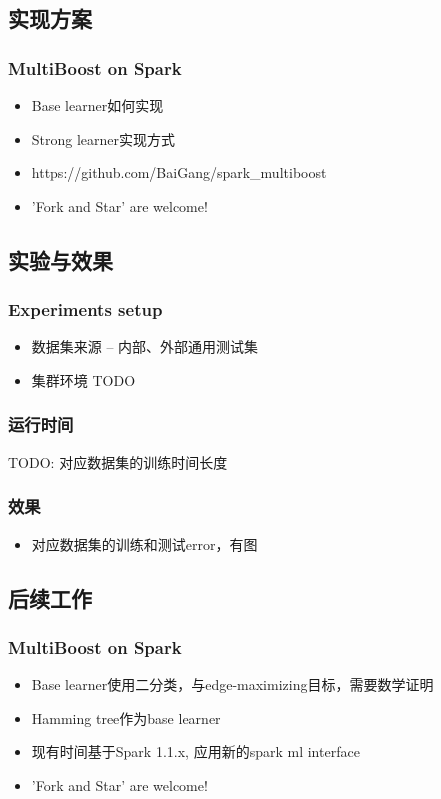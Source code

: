 \documentclass{beamer}
\begin{document}
\subsection{实现方案}

\begin{frame}
\frametitle{MultiBoost on Spark}
\begin{itemize}
\item Base learner如何实现
\item Strong learner实现方式
\item https://github.com/BaiGang/spark\_multiboost
\item 'Fork and Star' are welcome!
\end{itemize}
\end{frame}

\subsection{实验与效果}

\begin{frame}
\frametitle{Experiments setup}
\begin{itemize}
\item 数据集来源 -- 内部、外部通用测试集
\item 集群环境 TODO
\end{itemize}
\end{frame}

\begin{frame}
\frametitle{运行时间}
TODO: 对应数据集的训练时间长度
\end{frame}

\begin{frame}
\frametitle{效果}
\begin{itemize}
\item 对应数据集的训练和测试error，有图
\end{itemize}
\end{frame}


\subsection{后续工作}

\begin{frame}
\frametitle{MultiBoost on Spark}
\begin{itemize}
\item Base learner使用二分类，与edge-maximizing目标，需要数学证明
\item Hamming tree作为base learner
\item 现有时间基于Spark 1.1.x, 应用新的spark ml interface
\item 'Fork and Star' are welcome!
\end{itemize}
\end{frame}
\end{document}
